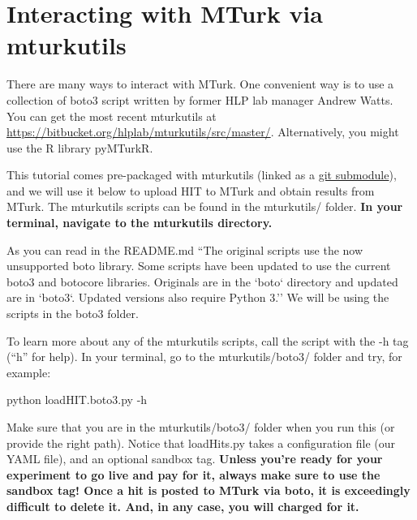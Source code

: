 \documentclass{article}
\newenvironment{code}%
   {\par\noindent\adjustbox{margin=1ex,bgcolor=shadecolor,margin=0ex \medskipamount}\bgroup\minipage\linewidth\verbatim}%
   {\endverbatim\endminipage\egroup}
\begin{document}
\section{Interacting with MTurk via mturkutils}

There are many ways to interact with MTurk. One convenient way is to use a collection of boto3 script written by former HLP lab manager Andrew Watts. You can get the most recent mturkutils at \url{https://bitbucket.org/hlplab/mturkutils/src/master/}. Alternatively, you might use the R library pyMTurkR. 

This tutorial comes pre-packaged with mturkutils (linked as a \href{https://git-scm.com/book/en/v2/Git-Tools-Submodules}{git submodule}), and we will use it below to upload HIT to MTurk and obtain results from MTurk. The mturkutils scripts can be found in the mturkutils/ folder. \textbf{In your terminal, navigate to the mturkutils directory.} 

As you can read in the README.md ``The original scripts use the now unsupported boto library. Some scripts have been updated to use the current boto3 and botocore libraries. Originals are in the `boto` directory and updated are in `boto3`. Updated versions also require Python 3.'' We will be using the scripts in the boto3 folder. 



To learn more about any of the mturkutils scripts, call the script with the -h tag (``h'' for help). In your terminal, go to the mturkutils/boto3/ folder and try, for example:

\begin{code}
python loadHIT.boto3.py -h
\end{code}

Make sure that you are in the mturkutils/boto3/ folder when you run this (or provide the right path). Notice that loadHits.py takes a configuration file (our YAML file), and an optional sandbox tag. \textbf{Unless you're ready for your experiment to go live and pay for it, always make sure to use the sandbox tag! Once a hit is posted to MTurk via boto, it is exceedingly difficult to delete it. And, in any case, you will charged for it.}
\end{document}

